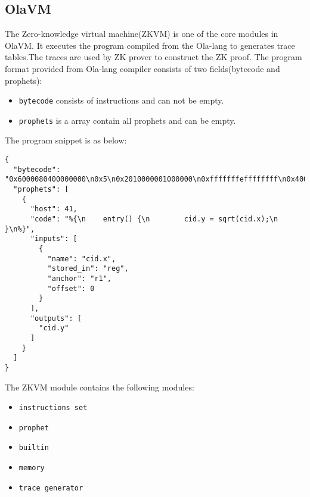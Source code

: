 \subsection{OlaVM} \label{sec:ola-vm}

The Zero-knowledge virtual machine(ZKVM) is one of the core modules in OlaVM. It executes the program compiled from the Ola-lang to generates trace tables.The traces are used by ZK prover to construct the ZK proof.
The program format provided from Ola-lang compiler consists of two fields(bytecode and prophets):
\begin{itemize}
    \item \verb|bytecode| consists of instructions and can not be empty.
    \item \verb|prophets| is a array contain all prophets and can be empty.
\end{itemize}

The program snippet is as below:
\begin{lstlisting}[label={lst:program-demo}]
{
  "bytecode": "0x6000080400000000\n0x5\n0x2010000001000000\n0xfffffffeffffffff\n0x4000000840000000\n0x0\n0x0030000001000000\n",
  "prophets": [
    {
      "host": 41,
      "code": "%{\n    entry() {\n        cid.y = sqrt(cid.x);\n    }\n%}",
      "inputs": [
        {
          "name": "cid.x",
          "stored_in": "reg",
          "anchor": "r1",
          "offset": 0
        }
      ],
      "outputs": [
        "cid.y"
      ]
    }
  ]
}
\end{lstlisting}


The ZKVM module contains the following modules:
\begin{itemize}
    \item \verb|instructions set|
    \item \verb|prophet|
    \item \verb|builtin|
    \item \verb|memory|
    \item \verb|trace generator|
\end{itemize}






